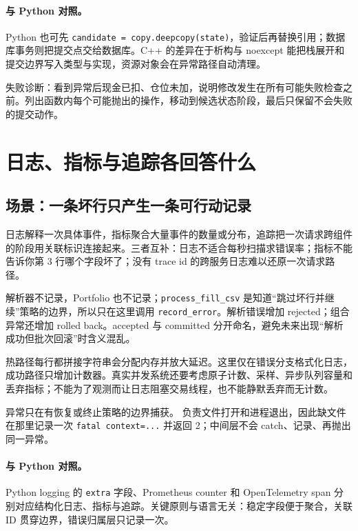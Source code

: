\paragraph{与 Python 对照。}
Python 也可先 \texttt{candidate = copy.deepcopy(state)}，验证后再替换引用；数据库事务则把提交点交给数据库。C++ 的差异在于析构与 noexcept 能把栈展开和提交边界写入类型与实现，资源对象会在异常路径自动清理。

失败诊断：看到异常后现金已扣、仓位未加，说明修改发生在所有可能失败检查之前。列出函数内每个可能抛出的操作，移动到候选状态阶段，最后只保留不会失败的提交动作。

\section{日志、指标与追踪各回答什么}

\subsection{场景：一条坏行只产生一条可行动记录}

日志解释一次具体事件，指标聚合大量事件的数量或分布，追踪把一次请求跨组件的阶段用关联标识连接起来。三者互补：日志不适合每秒扫描求错误率；指标不能告诉你第 3 行哪个字段坏了；没有 trace id 的跨服务日志难以还原一次请求路径。



解析器不记录，Portfolio 也不记录；\texttt{process\_fill\_csv} 是知道“跳过坏行并继续”策略的边界，所以只在这里调用 \texttt{record\_error}。解析错误增加 rejected；组合异常还增加 rolled back。accepted 与 committed 分开命名，避免未来出现“解析成功但批次回滚”时含义混乱。

热路径每行都拼接字符串会分配内存并放大延迟。这里仅在错误分支格式化日志，成功路径只增加计数器。真实并发系统还要考虑原子计数、采样、异步队列容量和丢弃指标；不能为了观测而让日志阻塞交易线程，也不能静默丢弃而无计数。

异常只在有恢复或终止策略的边界捕获。 负责文件打开和进程退出，因此缺文件在那里记录一次 \texttt{fatal context=...} 并返回 2；中间层不会 catch、记录、再抛出同一异常。

\paragraph{与 Python 对照。}
Python logging 的 \texttt{extra} 字段、Prometheus counter 和 OpenTelemetry span 分别对应结构化日志、指标与追踪。关键原则与语言无关：稳定字段便于聚合，关联 ID 贯穿边界，错误归属层只记录一次。

